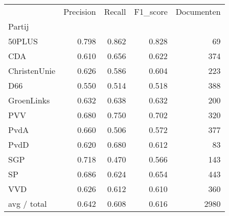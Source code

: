 \begin{tabular}{lrrrr}
\toprule
{} &  Precision &  Recall &  F1\_score &  Documenten \\
Partij       &            &         &           &             \\
\midrule
50PLUS       &      0.798 &   0.862 &     0.828 &          69 \\
   CDA       &      0.610 &   0.656 &     0.622 &         374 \\
ChristenUnie &      0.626 &   0.586 &     0.604 &         223 \\
   D66       &      0.550 &   0.514 &     0.518 &         388 \\
  GroenLinks &      0.632 &   0.638 &     0.632 &         200 \\
   PVV       &      0.680 &   0.750 &     0.702 &         320 \\
  PvdA       &      0.660 &   0.506 &     0.572 &         377 \\
  PvdD       &      0.620 &   0.680 &     0.612 &          83 \\
   SGP       &      0.718 &   0.470 &     0.566 &         143 \\
    SP       &      0.686 &   0.624 &     0.654 &         443 \\
   VVD       &      0.626 &   0.612 &     0.610 &         360 \\
 avg / total &      0.642 &   0.608 &     0.616 &        2980 \\
\bottomrule
\end{tabular}
